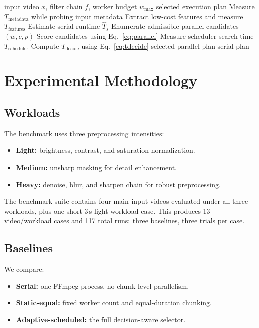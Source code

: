 \documentclass[conference]{IEEEtran}
\newcommand{\RunCount}{117}
\newcommand{\CaseCount}{13}
\begin{document}
\begin{algorithm}[t]
\caption{Decision-Aware Execution Selection}
\label{alg:select}
\begin{algorithmic}[1]
\REQUIRE input video $x$, filter chain $f$, worker budget $w_{\max}$
\ENSURE selected execution plan
\STATE Measure $T_{\mathrm{metadata}}$ while probing input metadata
\STATE Extract low-cost features and measure $T_{\mathrm{features}}$
\STATE Estimate serial runtime $\hat{T}_s$
\STATE Enumerate admissible parallel candidates $(w,c,p)$
\STATE Score candidates using Eq.~\ref{eq:parallel}
\STATE Measure scheduler search time $T_{\mathrm{scheduler}}$
\STATE Compute $T_{\mathrm{decide}}$ using Eq.~\ref{eq:tdecide}
\RETURN selected parallel plan
\ELSE
\RETURN serial plan
\ENDIF
\end{algorithmic}
\end{algorithm}

\section{Experimental Methodology}

\subsection{Workloads}

The benchmark uses three preprocessing intensities:
\begin{itemize}
\item \textbf{Light:} brightness, contrast, and saturation normalization.
\item \textbf{Medium:} unsharp masking for detail enhancement.
\item \textbf{Heavy:} denoise, blur, and sharpen chain for robust preprocessing.
\end{itemize}

The benchmark suite contains four main input videos evaluated under all three workloads, plus one short 3\,s light-workload case.
This produces \CaseCount{} video/workload cases and \RunCount{} total runs: three baselines, three trials per case.

\subsection{Baselines}

We compare:
\begin{itemize}
\item \textbf{Serial:} one FFmpeg process, no chunk-level parallelism.
\item \textbf{Static-equal:} fixed worker count and equal-duration chunking.
\item \textbf{Adaptive-scheduled:} the full decision-aware selector.
\end{itemize}
\end{document}
